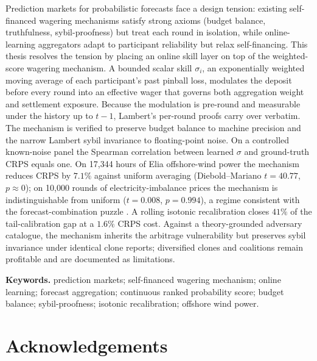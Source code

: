 \documentclass[
  11pt,
  a4paper,
  oneside]{report}
\begin{document}
Prediction markets for probabilistic forecasts face a design tension:
existing self-financed wagering mechanisms
\citep{lambert2008selffinanced,
raja2024wagering} satisfy strong axioms (budget balance, truthfulness,
sybil-proofness) but treat each round in isolation, while
online-learning aggregators \citep{vitali2025intermittent} adapt to
participant reliability but relax self-financing. This thesis resolves
the tension by placing an online skill layer on top of the
weighted-score wagering mechanism. A bounded scalar skill \(\sigma_i\),
an exponentially weighted moving average of each participant's past
pinball loss, modulates the deposit before every round into an effective
wager that governs both aggregation weight and settlement exposure.
Because the modulation is pre-round and measurable under the history up
to \(t-1\), Lambert's per-round proofs carry over verbatim. The
mechanism is verified to preserve budget balance to machine precision
and the narrow Lambert sybil invariance to floating-point noise. On a
controlled known-noise panel the Spearman correlation between learned
\(\sigma\) and ground-truth CRPS equals one. On 17,344 hours of Elia
offshore-wind power the mechanism reduces CRPS by \(7.1\%\) against
uniform averaging (Diebold--Mariano \(t = 40.77\), \(p \approx 0\)); on
10,000 rounds of electricity-imbalance prices the mechanism is
indistinguishable from uniform (\(t = 0.008\), \(p = 0.994\)), a regime
consistent with the forecast-combination puzzle
\citep{timmermann2006forecast}. A rolling isotonic recalibration
\citep{kuleshov2018accurate} closes \(41\%\) of the tail-calibration gap
at a \(1.6\%\) CRPS cost. Against a theory-grounded adversary catalogue,
the mechanism inherits the \citet{chen2014arbitrage} arbitrage
vulnerability but preserves sybil invariance under identical clone
reports; diversified clones and coalitions remain profitable and are
documented as limitations.

\vspace{1em}

\noindent\textbf{Keywords.} prediction markets; self-financed wagering
mechanism; online learning; forecast aggregation; continuous ranked
probability score; budget balance; sybil-proofness; isotonic
recalibration; offshore wind power.

\chapter*{Acknowledgements}
\end{document}
